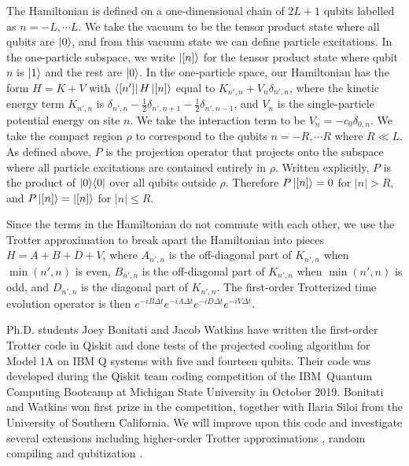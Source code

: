 \documentclass[11pt]{article}
\begin{document}
The Hamiltonian is defined on a one-dimensional chain of $2L+1$ qubits labelled as $n = -L,\cdots L$.
We take the vacuum to be the tensor product state where all qubits are $\ket{0}$, and from this vacuum state we can define particle excitations.  In the one-particle
subspace, we write $\ket{[n]}$ for the tensor product state where qubit $n$
is $\ket{1}$ and the rest are $\ket{0}$. In the one-particle space, our Hamiltonian
has the form  $H=K+V$ with $\bra{[n']}H\ket{[n]}$ equal to $K_{n',n} + V_{n}\delta_{n',n}$,
where the kinetic energy term $K_{n',n}$ is $\delta_{n',n}-\tfrac{1}{2}\delta_{n',n+1}-\tfrac{1}{2}\delta_{n',n-1}$,
and $V_n$ is the single-particle potential energy on site $n$. We take the
interaction term to be $V_{n}=-c_0\delta_{0,n}$.
 We  take the compact region $\rho$ to correspond to the qubits $n = -R,
\cdots R$ where $R \ll L$.  As defined above, $P$ is the projection operator
that
projects onto the subspace where all particle excitations are contained entirely
in $\rho$.  Written explicitly, $P$ is the product of $\ket{0}\!\bra{0}$
over all qubits outside $\rho$.  Therefore $P\ket{[n]}=0$ for $|n|>R,$ and
$P\ket{[n]}=\ket{[n]}$ for $|n|\le R$. 

 Since the terms in the Hamiltonian do not commute with each other, we use
the Trotter approximation to
break apart the Hamiltonian into pieces $H=A+B+D+V$, where $A_{n',n}$ is
the off-diagonal part of $K_{n',n}$ when $\min(n',n) $ is even, $B_{n',n}$
is the off-diagonal part of $K_{n',n}$ when $\min(n',n)$ is odd, and $D_{n',n}$
is the diagonal part of $K_{n',n}$.  The first-order Trotterized time evolution operator is then 
$e^{-iB\Delta t}e^{-iA\Delta t}e^{-iD\Delta t}e^{-iV\Delta t}$.  
 
Ph.D. students Joey Bonitati and Jacob Watkins have written the first-order Trotter code in Qiskit and done tests
of the projected cooling algorithm for Model 1A on IBM Q systems with five
and fourteen qubits.  Their code was developed during the 
Qiskit team coding competition of the IBM\ Quantum Computing Bootcamp
at Michigan State University in October 2019.   Bonitati
and Watkins won first prize in the competition, together with
Ilaria Siloi from the University of Southern California.  We will improve upon this code and investigate several extensions including higher-order Trotter approximations \cite{Childs:2019a}, random compiling \cite{Campbell:2019a} and qubitization \cite{Hao_Low:2016a}.
\end{document}
